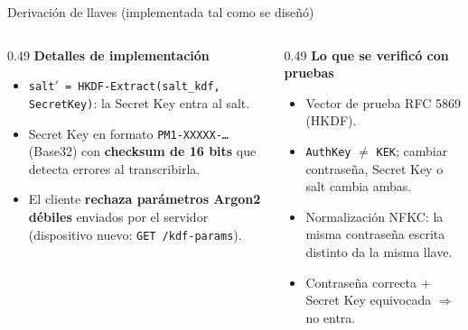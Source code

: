 \documentclass[aspectratio=169,10pt]{beamer}
\newcommand{\key}[1]{\textcolor{cripto}{\texttt{#1}}}
\begin{document}
\begin{frame}{Derivación de llaves (implementada tal como se diseñó)}
  \vspace{2mm}
  \begin{columns}[T]
    \begin{column}{0.49\textwidth}
      \footnotesize
      \textbf{Detalles de implementación}
      \begin{itemize}
        \item \texttt{salt$'$ = HKDF-Extract(salt\_kdf, SecretKey)}: la Secret Key entra al salt.
        \item Secret Key en formato \texttt{PM1-XXXXX-\ldots} (Base32) con \textbf{checksum de 16 bits}
              que detecta errores al transcribirla.
        \item El cliente \textbf{rechaza parámetros Argon2 débiles} enviados por el servidor
              (dispositivo nuevo: \texttt{GET /kdf-params}).
      \end{itemize}
    \end{column}
    \begin{column}{0.49\textwidth}
      \footnotesize
      \textbf{Lo que se verificó con pruebas}
      \begin{itemize}
        \item Vector de prueba RFC 5869 (HKDF).
        \item \key{AuthKey} $\neq$ \key{KEK}; cambiar contraseña, Secret Key o salt cambia ambas.
        \item Normalización NFKC: la misma contraseña escrita distinto da la misma llave.
        \item Contraseña correcta + Secret Key equivocada $\Rightarrow$ no entra.
      \end{itemize}
    \end{column}
  \end{columns}
\end{frame}
\end{document}
